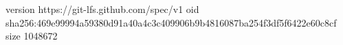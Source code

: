 version https://git-lfs.github.com/spec/v1
oid sha256:469e99994a59380d91a40a4c3c409906b9b4816087ba254f3df5f6422e60c8cf
size 1048672
